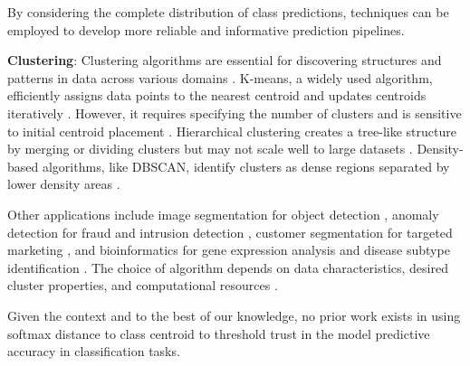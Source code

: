 By considering the complete distribution of class predictions, techniques can be employed to develop more reliable and informative prediction pipelines. 


\textbf{Clustering}: Clustering algorithms are essential for discovering structures and patterns in data across various domains \citep{jain2010data, xu2015comprehensive}. K-means, a widely used algorithm, efficiently assigns data points to the nearest centroid and updates centroids iteratively \citep{lloyd1982least}. However, it requires specifying the number of clusters and is sensitive to initial centroid placement \citep{arthur2007k}. Hierarchical clustering creates a tree-like structure by merging or dividing clusters \citep{johnson1967hierarchical} but may not scale well to large datasets \citep{mullner2011modern}. Density-based algorithms, like DBSCAN, identify clusters as dense regions separated by lower density areas \citep{ester1996density, schubert2017dbscan}.

Other applications include image segmentation for object detection \citep{shi2000normalized}, anomaly detection for fraud and intrusion detection \citep{chandola2009anomaly}, customer segmentation for targeted marketing \citep{ngai2009application}, and bioinformatics for gene expression analysis and disease subtype identification \citep{eisen1998cluster, jiang2004cluster}. The choice of algorithm depends on data characteristics, desired cluster properties, and computational resources \citep{rodriguez2019clustering}.

Given the context and to the best of our knowledge, no prior work exists in using softmax distance to class centroid to threshold trust in the model predictive accuracy in classification tasks.


